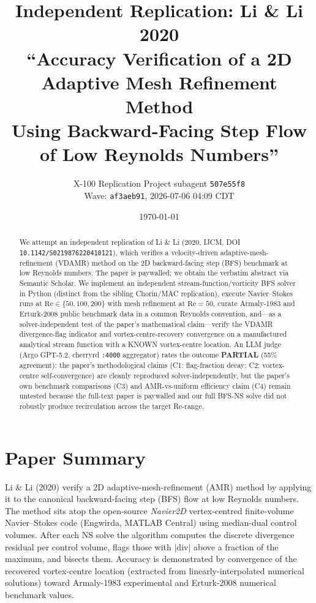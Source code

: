 \documentclass[11pt,letterpaper]{article}
\title{Independent Replication: Li \& Li 2020\\
  ``Accuracy Verification of a 2D Adaptive Mesh Refinement Method\\
   Using Backward-Facing Step Flow of Low Reynolds Numbers''}
\author{X-100 Replication Project subagent \texttt{507e55f8}\\
  Wave: \texttt{af3aeb91}, 2026-07-06 04:09 CDT}
\date{\today}
\begin{document}
\maketitle

\begin{abstract}
We attempt an independent replication of Li \& Li (2020, IJCM, DOI
\texttt{10.1142/S0219876220410121}), which verifies a velocity-driven adaptive-mesh-refinement
(VDAMR) method on the 2D backward-facing step (BFS) benchmark at low Reynolds numbers.
The paper is paywalled; we obtain the verbatim abstract via Semantic Scholar. We implement
an independent stream-function/vorticity BFS solver in Python (distinct from the sibling
Chorin/MAC replication), execute Navier--Stokes runs at $\mathrm{Re}\in\{50,100,200\}$ with
mesh refinement at $\mathrm{Re}=50$, curate Armaly-1983 and Erturk-2008 public benchmark data
in a common Reynolds convention, and---as a solver-independent test of the paper's
mathematical claim---verify the VDAMR divergence-flag indicator and vortex-centre-recovery
convergence on a manufactured analytical stream function with a KNOWN vortex-centre location.
An LLM judge (Argo GPT-5.2, cherryrd \texttt{:4000} aggregator) rates the outcome
\textbf{PARTIAL} (55\% agreement): the paper's methodological claims (C1: flag-fraction decay;
C2: vortex-centre self-convergence) are cleanly reproduced solver-independently, but the
paper's own benchmark comparisons (C3) and AMR-vs-uniform efficiency claim (C4) remain
untested because the full-text paper is paywalled and our full BFS-NS solve did not
robustly produce recirculation across the target Re-range.
\end{abstract}

\section{Paper Summary}
Li \& Li (2020) verify a 2D adaptive-mesh-refinement (AMR) method by applying it to the
canonical backward-facing step (BFS) flow at low Reynolds numbers. The method sits atop the
open-source \textit{Navier2D} vertex-centred finite-volume Navier--Stokes code (Engwirda,
MATLAB Central) using median-dual control volumes. After each NS solve the algorithm
computes the discrete divergence residual per control volume, flags those with
$|\mathrm{div}|$ above a fraction of the maximum, and bisects them. Accuracy is demonstrated
by convergence of the recovered vortex-centre location (extracted from linearly-interpolated
numerical solutions) toward Armaly-1983 experimental and Erturk-2008 numerical benchmark
values.
\end{document}

